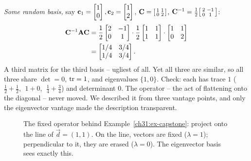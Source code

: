\begin{example}
\emph{Some random basis,} say $\mathbf{c}_1=\begin{bmatrix}1\\0\end{bmatrix},\mathbf{c}_2=\begin{bmatrix}1\\2\end{bmatrix}$,
$\mathbf{C}=\begin{bsmallmatrix}1&1\\0&2\end{bsmallmatrix}$,
$\mathbf{C}^{-1}=\tfrac12\begin{bsmallmatrix}2&-1\\0&1\end{bsmallmatrix}$:
\begin{align*}
  \mathbf{C}^{-1}\mathbf{A}\mathbf{C}
  &= \frac12\begin{bmatrix}2&-1\\0&1\end{bmatrix}\cdot\frac12\begin{bmatrix}1&1\\1&1\end{bmatrix}\cdot\begin{bmatrix}1&1\\0&2\end{bmatrix} \\
  &= \begin{bmatrix}1/4 & 3/4\\ 1/4 & 3/4\end{bmatrix}.
\end{align*}
A third matrix for the third basis -- ugliest of all. Yet all three are similar,
so all three share $\det=0$, $\operatorname{tr}=1$, and eigenvalues $\{1,0\}$. Check: each has
trace $1$ ($\tfrac12+\tfrac12$, $\;1+0$, $\;\tfrac14+\tfrac34$) and determinant $0$.
The operator -- the act of flattening onto the diagonal -- never moved. We
described it from three vantage points, and only the eigenvector vantage made the
description transparent.
\end{example}

\begin{figure}[H]
\centering
{}
\caption{The fixed operator behind Example~\ref{ch31:ex-capstone}: project onto the
line of $\vec{d}=(1,1)$. On the line, vectors are fixed ($\lambda=1$); perpendicular
to it, they are erased ($\lambda=0$). The eigenvector basis sees exactly this.}
\label{ch31:fig-capstone}
\end{figure}

